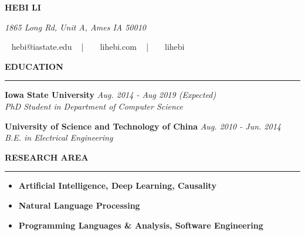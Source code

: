 \documentclass[10pt,letterpaper]{article}
\newenvironment{mysection}[1]{ %
  \medskip
  \MakeUppercase{\bf #1}
  \medskip
  \hrule
  \begin{list}{}{
      \setlength{\leftmargin}{1.5em}
    }
  \item[]
}{
  \end{list}
}
\begin{document}
\centerline{\MakeUppercase{\huge\bf Hebi Li}}
\centerline{\textit{\textcolor{mygray}{1865 Long Rd, Unit A, Ames IA
      50010}}} \centerline{\faEnvelope ~ hebi@iastate.edu ~ | ~
  \faHome ~ lihebi.com ~ | ~ \faGithubSquare ~ lihebi}

\begin{mysection}{Education}
  \textbf{Iowa State University} \hfill \emph{Aug. 2014 - Aug 2019 (Expected)} \\
  \emph{PhD Student in Department of Computer Science}

  \textbf{University of Science and Technology of China}
  \hfill \emph{Aug. 2010 - Jun. 2014} \\
  \emph{B.E. in Electrical Engineering}
\end{mysection}

\begin{mysection}{Research Area}
  \begin{itemize}
  \item \textbf{Artificial Intelligence, Deep Learning, Causality}
  \item \textbf{Natural Language Processing}
  \item \textbf{Programming Languages \& Analysis, Software Engineering}
  \end{itemize}
\end{mysection}
\end{document}
